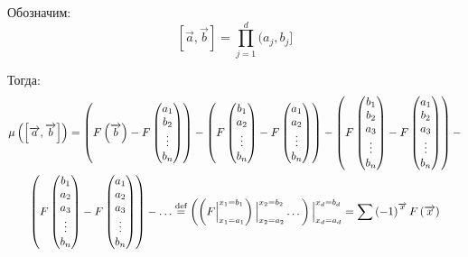 Обозначим:
\[
    \left[ \overrightarrow{a}, \overrightarrow{b} \right] = \prod_{j = 1}^{d} (a_j, b_j]
\]

Тогда:
\begin{multline*}
    \mu\left(\left[ \overrightarrow{a}, \overrightarrow{b} \right]\right) =
        \left(
            F\left(\overrightarrow{b}\right) -
            F\begin{pmatrix} a_1 \\ b_2 \\ \vdots \\ b_n \end{pmatrix}
        \right) -
        \left(
            F\begin{pmatrix} b_1 \\ a_2 \\ \vdots \\ b_n \end{pmatrix} -
            F\begin{pmatrix} a_1 \\ a_2 \\ \vdots \\ b_n \end{pmatrix}
        \right) -
        \left(
            F\begin{pmatrix} b_1 \\ b_2 \\ a_3 \\ \vdots \\ b_n \end{pmatrix} -
            F\begin{pmatrix} a_1 \\ b_2 \\ a_3 \\ \vdots \\ b_n \end{pmatrix}
        \right) - \\
        \left(
            F\begin{pmatrix} b_1 \\ a_2 \\ a_3 \\ \vdots \\ b_n \end{pmatrix} -
            F\begin{pmatrix} a_1 \\ a_2 \\ a_3 \\ \vdots \\ b_n \end{pmatrix}
        \right) -
        \dots \stackrel{\text{def}}{=}
    \left( \left( F \Big|_{x_1 = a_1}^{x_1 = b_1} \right) \Big|_{x_2 = a_2}^{x_2 = b_2} \dots \right)
    \Big|_{x_d = a_d}^{x_d = b_d} = \sum\left(-1\right)^{\overrightarrow{x}}
        F\left( \overrightarrow{x} \right)
\end{multline*}

